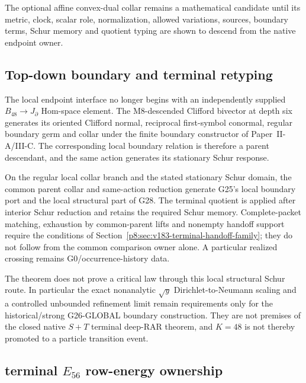 \documentclass[12pt,a4paper]{article}
\begin{document}
The optional affine convex-dual collar remains a mathematical candidate until
its metric, clock, scalar role, normalization, allowed variations, sources,
boundary terms, Schur memory and quotient typing are shown to descend from
the native endpoint owner.



\subsection{Top-down boundary and terminal retyping}
\label{p8:sec:v187-topdown-boundary-terminal}
The local endpoint interface no longer begins with an independently supplied
$B_{48}\to J_\partial$ Hom-space element.  The M8-descended Clifford bivector
at depth six generates its oriented Clifford normal, reciprocal first-symbol
conormal, regular boundary germ and collar under the finite boundary
constructor of Paper~II-A/III-C.  The corresponding local boundary relation is
therefore a parent descendant, and the same action generates its stationary
Schur response.

\begin{theorem}
\label{p8:thm:v187-structural-endpoint-interface}
On the regular local collar branch and the stated stationary Schur
domain, the common parent collar and same-action reduction generate G25's
local boundary port and the local structural part of G28. The terminal
quotient is applied after interior Schur reduction and retains the required
Schur memory. Complete-packet matching, exhaustion by common-parent lifts
and nonempty handoff support require the conditions of
Section~\ref{p8:sec:v183-terminal-handoff-family}; they do not follow from
the common comparison owner alone. A particular realized crossing remains
G0/occurrence-history data.
\end{theorem}

The theorem does not prove a critical law through this local structural
Schur route.  In particular the exact nonanalytic $\sqrt y$
Dirichlet-to-Neumann scaling and a controlled unbounded refinement limit remain
requirements only for the historical/strong G26-GLOBAL boundary construction.
They are not premises of the closed native $S+T$ terminal deep-RAR theorem,
and $K=48$ is not thereby promoted to a particle transition event.


\subsection{terminal \texorpdfstring{\(E_{56}\)}{E56} row-energy ownership}
\label{p8:sec:v2100-d4-k56-terminal-rowenergy}
\end{document}
